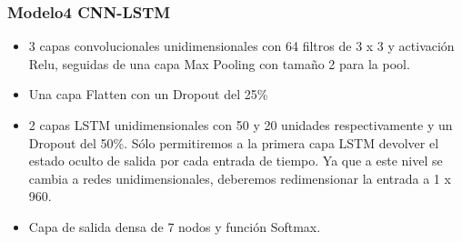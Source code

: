 \documentclass[11pt,a4paper,spanish]{book}
\begin{document}
	
		\subsubsection{Modelo4 CNN-LSTM}
		\label{cap4:Modelo4}
		\begin{itemize}
			\item 3 capas convolucionales unidimensionales con 64 filtros de 3 x 3 y activación Relu, seguidas de una capa Max Pooling con tamaño 2 para la pool.
			
			\item Una capa Flatten con un Dropout del 25\%
			
			\item 2 capas LSTM unidimensionales con 50 y 20 unidades respectivamente y un Dropout del 50\%. Sólo permitiremos a la primera capa LSTM devolver el estado oculto de salida por cada entrada de tiempo. Ya que a este nivel se cambia a redes unidimensionales, deberemos redimensionar la entrada a 1 x 960.
			
			\item Capa de salida densa de 7 nodos y función Softmax.
			
		\end{itemize}


	
\end{document}
